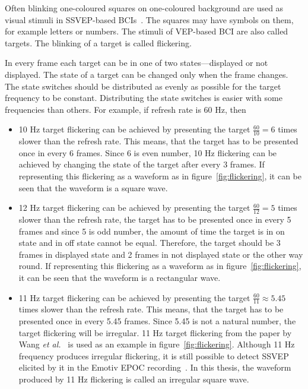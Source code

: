 Often blinking one-coloured squares on one-coloured background are used as visual stimuli in \gls{SSVEP}-based \glspl{BCI}~\cite{ssvep_stim}. The squares may have symbols on them, for example letters or numbers. The stimuli of \gls{VEP}-based \gls{BCI} are also called \glspl{target}. The blinking of a target is called \gls{flickering}.

In every frame each \gls{target} can be in one of two states---displayed or not displayed. The state of a \gls{target} can be changed only when the frame changes. The state switches should be distributed as evenly as possible for the target frequency to be constant. Distributing the state switches is easier with some frequencies than others. For example, if refresh rate is 60 Hz, then
\begin{itemize}
	\item 10 Hz \gls{target} \gls{flickering} can be achieved by presenting the \gls{target} $\frac{60}{10}=6$ times slower than the refresh rate. This means, that the \gls{target} has to be presented once in every 6 frames. Since 6 is even number, 10 Hz \gls{flickering} can be achieved by changing the state of the \gls{target} after every 3 frames. If representing this \gls{flickering} as a waveform as in figure~\ref{fig:flickering}, it can be seen that the waveform is a \gls{square wave}.
	\item 12 Hz \gls{target} \gls{flickering} can be achieved by presenting the \gls{target} $\frac{60}{12}=5$ times slower than the refresh rate, the \gls{target} has to be presented once in every 5 frames and since 5 is odd number, the amount of time the target is in on state and in off state cannot be equal. Therefore, the \gls{target} should be 3 frames in displayed state and 2 frames in not displayed state or the other way round. If representing this \gls{flickering} as a waveform as in figure~\ref{fig:flickering}, it can be seen that the waveform is a \gls{rectangular wave}.
	\item 11 Hz \gls{target} \gls{flickering} can be achieved by presenting the \gls{target} $\frac{60}{11}\approx 5.45$ times slower than the refresh rate. This means, that the \gls{target} has to be presented once in every 5.45 frames. Since 5.45 is not a natural number, the \gls{target} \gls{flickering} will be irregular. 11 Hz target \gls{flickering} from the paper by Wang \textit{et al.}~\cite{11hz} is used as an example in figure~\ref{fig:flickering}. Although 11 Hz frequency produces irregular \gls{flickering}, it is still possible to detect \gls{SSVEP} elicited by it in the Emotiv EPOC recording~\cite{emotiv_11hz}. In this thesis, the waveform produced by 11 Hz \gls{flickering} is called an \gls{irregular square wave}.
\end{itemize}

